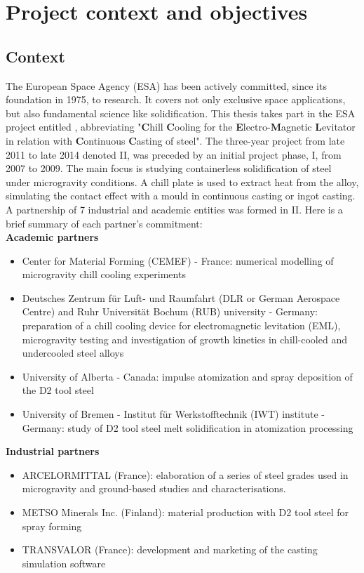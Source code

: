 \section{Project context and objectives}
%
\subsection{Context}
The European Space Agency (ESA) has been actively committed, since its foundation in 1975, to research.
It covers not only exclusive space applications, but also fundamental science like solidification. 
This thesis takes part in the ESA project entitled \ccemlcc, abbreviating
"\textbf{C}hill \textbf{C}ooling for the \textbf{E}lectro-\textbf{M}agnetic \textbf{L}evitator in relation with 
\textbf{C}ontinuous \textbf{C}asting of steel".
The three-year project from late 2011 to late 2014 denoted \ccemlcc II, was preceded by an initial project phase, \ccemlcc I,
from 2007 to 2009. The main focus is studying containerless solidification of steel under microgravity conditions. 
A chill plate is used to extract heat from the alloy, simulating the contact effect with a mould in continuous casting
or ingot casting.
A partnership of 7 industrial and academic entities was formed in \ccemlcc II. 
Here is a brief summary of each partner's commitment:\\

\textbf{Academic partners} 
 \begin{itemize}
\itemsep0em
\item Center for Material Forming (CEMEF) - France: numerical modelling of microgravity chill cooling experiments
\item Deutsches Zentrum für Luft- und Raumfahrt (DLR or German Aerospace Centre) and Ruhr Universität Bochum (RUB) university - Germany:  preparation of a chill cooling device 
for electromagnetic levitation (EML), microgravity testing and investigation of growth kinetics 
in chill-cooled and undercooled steel alloys
\item University of Alberta - Canada: impulse atomization and spray deposition of the D2 tool steel 
\item University of Bremen - Institut für Werkstofftechnik (IWT) institute - Germany: 
study of D2 tool steel melt solidification in atomization processing
\end{itemize}

\textbf{Industrial partners}
\begin{itemize}
\itemsep0em
\item ARCELORMITTAL (France): elaboration of a series of steel grades used in microgravity and ground-based studies and characterisations.
\item METSO Minerals Inc.  (Finland): material production with D2 tool steel for spray forming
\item TRANSVALOR (France): development and marketing of the casting simulation software \thercast
\end{itemize}

